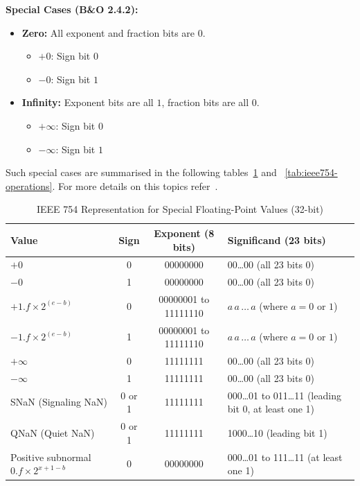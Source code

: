 \documentclass[12pt]{book}
\begin{document}
\begin{itemize}
\medskip
\textbf{Special Cases (B\&O 2.4.2):}
\begin{itemize}
    \item \textbf{Zero:} All exponent and fraction bits are 0.
    \begin{itemize}
        \item $+0$: Sign bit $0$
        \item $-0$: Sign bit $1$
    \end{itemize}
    \item \textbf{Infinity:} Exponent bits are all $1$, fraction bits are all $0$.
    \begin{itemize}
        \item $+\infty$: Sign bit $0$
        \item $-\infty$: Sign bit $1$
    \end{itemize}
\end{itemize}
Such special cases are summarised in the following tables~\ref{tab:ieee754-special} and ~\ref{tab:ieee754-operations}. For more details on this topics refer~\cite{rajaraman2016ieee}.
\begin{table}[H]
\centering
\renewcommand{\arraystretch}{1.4}
\begin{tabularx}{\textwidth}{|X|c|c|X|}
\hline
\textbf{Value} & \textbf{Sign} & \textbf{Exponent (8 bits)} & \textbf{Significand (23 bits)} \\
\hline
$+0$ & 0 & 00000000 & 00…00 (all 23 bits 0) \\
\hline
$-0$ & 1 & 00000000 & 00…00 (all 23 bits 0) \\
\hline
$+1.f \times 2^{(e-b)}$ & 0 & 00000001 to 11111110 & $a\,a\,\ldots\,a$ (where $a=0$ or $1$) \\
\hline
$-1.f \times 2^{(e-b)}$ & 1 & 00000001 to 11111110 & $a\,a\,\ldots\,a$ (where $a=0$ or $1$) \\
\hline
$+\infty$ & 0 & 11111111 & 00…00 (all 23 bits 0) \\
\hline
$-\infty$ & 1 & 11111111 & 00…00 (all 23 bits 0) \\
\hline
SNaN (Signaling NaN) & 0 or 1 & 11111111 & 000…01 to 011…11 (leading bit 0, at least one 1) \\
\hline
QNaN (Quiet NaN) & 0 or 1 & 11111111 & 1000…10 (leading bit 1) \\
\hline
Positive subnormal $0.f \times 2^{x+1-b}$ & 0 & 00000000 & 000…01 to 111…11 (at least one 1) \\
\hline
\end{tabularx}
\caption{IEEE 754 Representation for Special Floating-Point Values (32-bit)}
\label{tab:ieee754-special}
\end{table}


\end{itemize}
\end{document}
